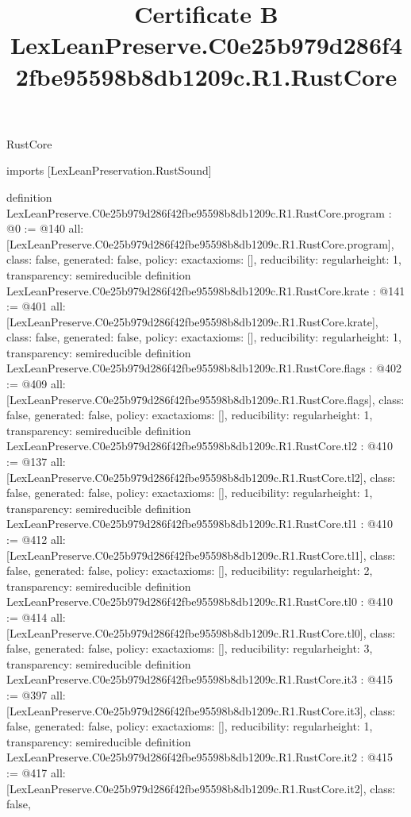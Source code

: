 \begin{lexlean}{RustCore}
\title{Certificate B LexLeanPreserve.C0e25b979d286f42fbe95598b8db1209c.R1.RustCore}
\begin{coremodule}
imports [LexLeanPreservation.RustSound]

definition LexLeanPreserve.C0e25b979d286f42fbe95598b8db1209c.R1.RustCore.program : @0 := @140 {
  all: [LexLeanPreserve.C0e25b979d286f42fbe95598b8db1209c.R1.RustCore.program],
  class: false,
  generated: false,
  policy: exact{axioms: []},
  reducibility: regular{height: 1},
  transparency: semireducible
}
definition LexLeanPreserve.C0e25b979d286f42fbe95598b8db1209c.R1.RustCore.krate : @141 := @401 {
  all: [LexLeanPreserve.C0e25b979d286f42fbe95598b8db1209c.R1.RustCore.krate],
  class: false,
  generated: false,
  policy: exact{axioms: []},
  reducibility: regular{height: 1},
  transparency: semireducible
}
definition LexLeanPreserve.C0e25b979d286f42fbe95598b8db1209c.R1.RustCore.flags : @402 := @409 {
  all: [LexLeanPreserve.C0e25b979d286f42fbe95598b8db1209c.R1.RustCore.flags],
  class: false,
  generated: false,
  policy: exact{axioms: []},
  reducibility: regular{height: 1},
  transparency: semireducible
}
definition LexLeanPreserve.C0e25b979d286f42fbe95598b8db1209c.R1.RustCore.tl2 : @410 := @137 {
  all: [LexLeanPreserve.C0e25b979d286f42fbe95598b8db1209c.R1.RustCore.tl2],
  class: false,
  generated: false,
  policy: exact{axioms: []},
  reducibility: regular{height: 1},
  transparency: semireducible
}
definition LexLeanPreserve.C0e25b979d286f42fbe95598b8db1209c.R1.RustCore.tl1 : @410 := @412 {
  all: [LexLeanPreserve.C0e25b979d286f42fbe95598b8db1209c.R1.RustCore.tl1],
  class: false,
  generated: false,
  policy: exact{axioms: []},
  reducibility: regular{height: 2},
  transparency: semireducible
}
definition LexLeanPreserve.C0e25b979d286f42fbe95598b8db1209c.R1.RustCore.tl0 : @410 := @414 {
  all: [LexLeanPreserve.C0e25b979d286f42fbe95598b8db1209c.R1.RustCore.tl0],
  class: false,
  generated: false,
  policy: exact{axioms: []},
  reducibility: regular{height: 3},
  transparency: semireducible
}
definition LexLeanPreserve.C0e25b979d286f42fbe95598b8db1209c.R1.RustCore.it3 : @415 := @397 {
  all: [LexLeanPreserve.C0e25b979d286f42fbe95598b8db1209c.R1.RustCore.it3],
  class: false,
  generated: false,
  policy: exact{axioms: []},
  reducibility: regular{height: 1},
  transparency: semireducible
}
definition LexLeanPreserve.C0e25b979d286f42fbe95598b8db1209c.R1.RustCore.it2 : @415 := @417 {
  all: [LexLeanPreserve.C0e25b979d286f42fbe95598b8db1209c.R1.RustCore.it2],
  class: false,
}
\end{coremodule}
\end{lexlean}
